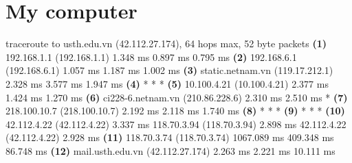 \documentclass{article}
\begin{document}
\section{My computer}
traceroute to usth.edu.vn (42.112.27.174), 64 hops max, 52 byte packets\linebreak
\textbf{ (1) } 192.168.1.1 (192.168.1.1)  1.348 ms  0.897 ms  0.795 ms\linebreak
\textbf{(2)} 192.168.6.1 (192.168.6.1)  1.057 ms  1.187 ms  1.002 ms\linebreak
\textbf{(3)}  static.netnam.vn (119.17.212.1)  2.328 ms  3.577 ms  1.947 ms\linebreak
 \textbf{(4)}  * * *\linebreak
\textbf{(5)}  10.100.4.21 (10.100.4.21)  2.377 ms  1.424 ms  1.270 ms\linebreak
 \textbf{(6)} ci228-6.netnam.vn (210.86.228.6)  2.310 ms  2.510 ms *\linebreak
 \textbf{(7)}  218.100.10.7 (218.100.10.7)  2.192 ms  2.118 ms  1.740 ms\linebreak
 \textbf{(8)}  * * *\linebreak
\textbf{(9)}  * * *\linebreak
\textbf{(10)}  42.112.4.22 (42.112.4.22)  3.337 ms
    118.70.3.94 (118.70.3.94)  2.898 ms
    42.112.4.22 (42.112.4.22)  2.928 ms\linebreak
\textbf{(11)}  118.70.3.74 (118.70.3.74)  1067.089 ms  409.348 ms  86.748 ms\linebreak
\textbf{(12)}  mail.usth.edu.vn (42.112.27.174)  2.263 ms  2.221 ms  10.111 ms\linebreak
\end{document}
